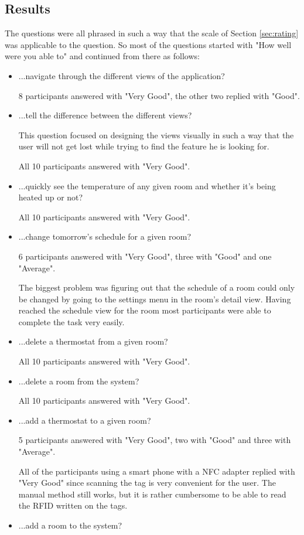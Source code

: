 \subsection{Results}
The questions were all phrased in such a way that the scale of Section \ref{sec:rating} was applicable to the question. So most of the questions started with "How well were you able to" and continued from there as follows:
\begin{itemize}
\item{...navigate through the different views of the application?}

8 participants answered with "Very Good", the other two replied with "Good".
\item{...tell the difference between the different views?}

This question focused on designing the views visually in such a way that the user will not get lost while trying to find the feature he is looking for.

All 10 participants answered with "Very Good". 
\item{...quickly see the temperature of any given room and whether it's being heated up or not?}

All 10 participants answered with "Very Good".
\item{...change tomorrow's schedule for a given room?}

6 participants answered with "Very Good", three with "Good" and one "Average".

The biggest problem was figuring out that the schedule of a room could only be changed by going to the settings menu in the room's detail view. Having reached the schedule view for the room most participants were able to complete the task very easily.

\item{...delete a thermostat from a given room?}

All 10 participants answered with "Very Good".
\item{...delete a room from the system?}

All 10 participants answered with "Very Good".
\item{...add a thermostat to a given room?}

5 participants answered with "Very Good", two with "Good" and three with "Average".

All of the participants using a smart phone with a NFC adapter replied with "Very Good" since scanning the tag is very convenient for the user. The manual method still works, but it is rather cumbersome to be able to read the RFID written on the tags.
\item{...add a room to the system?}


\end{itemize}
